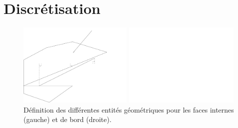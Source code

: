 %
%
%
%
%
%
%
%

\section{Discr\'etisation}

\begin{figure}[h]
\parbox{8cm}{%
\centerline{\includegraphics[height=4cm]{../Base/Gradmc/Images/facette.pdf}}}
\parbox{8cm}{%
\centerline{\includegraphics[height=4cm]{../Base/Gradmc/Images/facebord.pdf}}}
\caption{\label{Base_Gradmc_fig_geom_gradmc}D\'efinition des diff\'erentes entit\'es
g\'eom\'etriques pour les faces internes (gauche) et de bord (droite).}
\end{figure}

